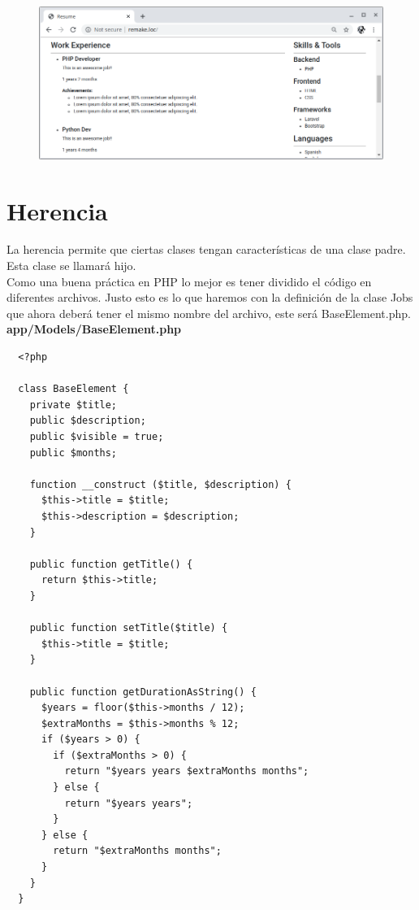 \documentclass{article}
\begin{document}
\begin{figure}[h!]
  \centering
  \includegraphics[scale=0.5]{./Pictures/042_constructor.png}
\end{figure}


\section{Herencia}%
La herencia permite que ciertas clases tengan características de una clase
padre. Esta clase se llamará hijo.\\

Como una buena práctica en PHP lo mejor es tener dividido el código en
diferentes archivos. Justo esto es lo que haremos con la definición de la clase
Jobs que ahora deberá tener el mismo nombre del archivo, este será
BaseElement.php.\\

\textbf{app/Models/BaseElement.php}
\begin{verbatim}
  <?php

  class BaseElement {
    private $title;
    public $description;
    public $visible = true;
    public $months;

    function __construct ($title, $description) {
      $this->title = $title;
      $this->description = $description;
    }

    public function getTitle() {
      return $this->title;
    }

    public function setTitle($title) {
      $this->title = $title;
    }

    public function getDurationAsString() {
      $years = floor($this->months / 12);
      $extraMonths = $this->months % 12;
      if ($years > 0) {
        if ($extraMonths > 0) {
          return "$years years $extraMonths months";
        } else {
          return "$years years";
        }
      } else {
        return "$extraMonths months";
      }
    }
  }
\end{verbatim}
\end{document}
